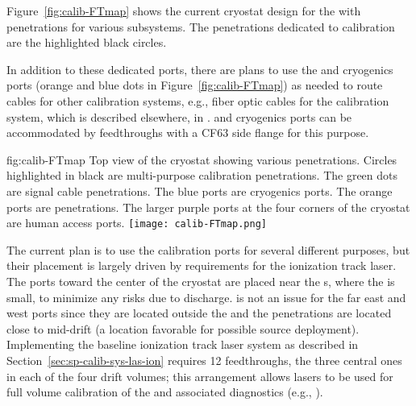
Figure~\ref{fig:calib-FTmap} shows the current cryostat design for the %
 with penetrations for various subsystems. The penetrations dedicated to calibration are the highlighted black circles. 

In addition to these dedicated ports, there are plans to use the  and cryogenics ports (orange and blue dots in Figure~\ref{fig:calib-FTmap}) as needed to route cables for other calibration systems, e.g., fiber optic cables for the  calibration system, which is described elsewhere, in  \spchpds.  and cryogenics ports can be accommodated by feedthroughs with a CF63 side flange for this purpose.   

\begin{dunefigure}{fig:calib-FTmap}
{Top view of the \spmod %
cryostat showing various penetrations. Circles highlighted in black are multi-purpose calibration penetrations. The green dots are  signal cable penetrations. The blue ports are cryogenics ports. The orange ports are  penetrations. The larger purple ports at the four corners of the cryostat are human access ports.}
\texttt{[image: calib-FTmap.png]}
\end{dunefigure}



The current plan is to use the calibration ports for several different purposes, but their placement is largely driven by requirements for the ionization track laser. %
The ports %
toward the center of the cryostat are placed near the s, where the \efield is small, %
to minimize any risks due to %
 discharge.  is not an issue for the far east and west ports since they are located outside the  and the penetrations are located %
close to mid-drift (a location favorable for possible source deployment).
Implementing the baseline ionization track laser system as %
described in Section~\ref{sec:sp-calib-sys-las-ion} requires \num{12} feedthroughs, the three central ones in each of the four  drift volumes; this arrangement allows lasers to be used for full volume calibration of the \efield and associated diagnostics (e.g., ). 

